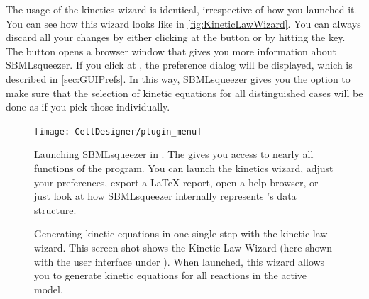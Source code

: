 The usage of the kinetics wizard is identical, irrespective of how you launched it.
You can see how this wizard looks like in \vref{fig:KineticLawWizard}.
You can always discard all your changes by either clicking at the  button or by hitting the \keys{\escwin} key.
The  button opens a browser window that gives you more information about SBMLsqueezer.
If you click at , the preference dialog will be displayed, which is described in \vref{sec:GUIPrefs}.
In this way, SBMLsqueezer gives you the option to make sure that the selection of kinetic equations for all distinguished cases will be done as if you pick those individually.
\begin{figure}
\texttt{[image: CellDesigner/plugin\_menu]}
\caption{Launching SBMLsqueezer in \CellDesigner.
The  gives you access to nearly all functions of the program.
You can launch the kinetics wizard, adjust your preferences, export a \LaTeX{} report, open a help browser, or just look at how SBMLsqueezer internally represents \CellDesigner's data structure.}
\label{fig:PluginMenu}
\end{figure}
\begin{figure}[b!]
\caption{Generating kinetic equations in one single step with the kinetic law wizard.
This screen-shot shows the Kinetic Law Wizard (here shown with the user interface
under \MacOSX). When launched, this wizard allows you to generate kinetic equations for all reactions in the active model.}
\label{fig:KineticLawWizard}
\end{figure}

